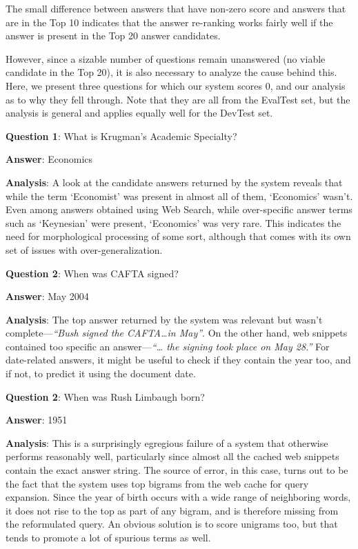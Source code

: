 \documentclass[11pt]{article}
\begin{document}
The small difference between answers that have non-zero score and answers that are in the Top 10 indicates that the answer re-ranking works fairly well if the answer is present in the Top 20 answer candidates. 

However, since a sizable number of questions remain unanswered (no viable candidate in the Top 20), it is also necessary to analyze the cause behind this.  Here, we present three questions for which our system scores 0, and our analysis as to why they fell through. Note that they are all from the EvalTest set, but the analysis is general and applies equally well for the DevTest set.


\noindent \textbf{Question 1}: What is Krugman's Academic Specialty? 

\noindent \textbf{Answer}: Economics

\noindent \textbf{Analysis}: A look at the candidate answers returned by the system reveals that while the term `Economist' was present in almost all of them, `Economics' wasn't. Even among answers obtained using Web Search, while over-specific answer terms such as `Keynesian' were present, `Economics' was very rare. This indicates the need for morphological processing of some sort, although that comes with its own set of issues with over-generalization.

\noindent \textbf{Question 2}: When was CAFTA signed? 

\noindent \textbf{Answer}: May 2004

\noindent \textbf{Analysis}: The top answer returned by the system was relevant but wasn't complete---\emph{``Bush signed the CAFTA\ldots{}in May''}. On the other hand, web snippets contained too specific an answer---\emph{``\ldots{} the signing took place on May 28.''} For date-related answers, it might be useful to check if they contain the year too, and if not, to predict it using the document date.


\noindent \textbf{Question 2}: When was Rush Limbaugh born?

\noindent \textbf{Answer}: 1951

\noindent \textbf{Analysis}:
This is a surprisingly egregious failure of a system that otherwise performs reasonably well, particularly since almost all the cached web snippets contain the exact answer string. The source of error, in this case, turns out to be the fact that the system uses top bigrams from the web cache for query expansion. Since the year of birth occurs with a wide range of neighboring words, it does not rise to the top as part of any bigram, and is therefore missing from the reformulated query. An obvious solution is to score unigrams too, but that tends to promote a lot of spurious terms as well.
\end{document}
